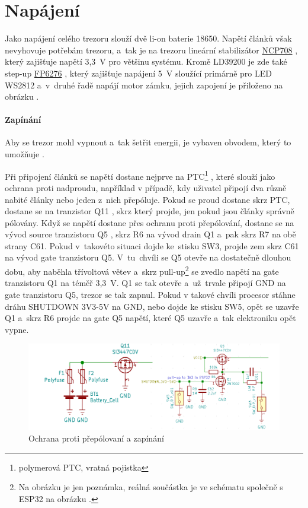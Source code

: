 \section{Napájení}
Jako napájení celého trezoru slouží dvě li-on baterie 18650. Napětí článků však nevyhovuje potřebám trezoru, a~tak je na trezoru lineární 
stabilizátor \href{https://datasheet.lcsc.com/szlcsc/1808280153_STMicroelectronics-LD39200PU33R_C222192.pdf}{NCP708} \parencite{LD39200}, 
který zajišťuje napětí 3,3~V pro většinu systému. Kromě LD39200 je zde také step-up \href{https://datasheet.lcsc.com/szlcsc/Feeling-Tech-FP6276AXR-G1_C83308.pdf}{FP6276} \parencite{fp6276a}, 
který zajišťuje napájení 5~V sloužící primárně pro LED WS2812 a~v~druhé řadě napájí motor zámku,
jejich zapojení je přiloženo na obrázku .

\paragraph*{Zapínání}
Aby se trezor mohl vypnout a~tak šetřit energii, je vybaven obvodem, který to umožňuje .

Při připojení článků se napětí dostane nejprve na PTC\footnote{polymerová PTC, vratná pojistka } \parencite{polyfuse},
které slouží jako ochrana proti nadproudu, například v případě, kdy uživatel připojí dva různě nabité články nebo jeden z~nich přepóluje.
Pokud se proud dostane skrz PTC, dostane se na tranzistor Q11 \parencite{power_MOSFET}, skrz který projde, jen pokud jsou články správně pólovány.
Když se napětí dostane přes ochranu proti přepólování, dostane se na 
vývod source
tranzistoru Q5 \parencite{power_MOSFET}, skrz R6 na vývod drain
Q1 a~pak skrz R7 na obě strany C61.
Pokud v~takovéto situaci dojde ke~stisku SW3, projde zem skrz C61 na vývod gate tranzistoru Q5. 
V~tu~chvíli se Q5 otevře na dostatečně dlouhou dobu, 
aby naběhla třívoltová větev a~skrz pull-up\footnote{Na obrázku je jen poznámka, reálná součástka je ve schématu společně s ESP32 na obrázku .}
se zvedlo napětí na gate tranzistoru Q1 na téměř 3,3~V. Q1 se tak otevře a~už~trvale připojí GND na gate tranzistoru Q5, trezor se tak zapnul. Pokud v takové chvíli procesor stáhne dráhu SHUTDOWN 3V3-5V 
na GND, nebo dojde ke stisku SW5, opět se uzavře Q1 a~skrz R6 projde na gate Q5 napětí, které Q5 uzavře a~tak elektroniku opět vypne.

\begin{figure}[h]
    \centering
    \includegraphics[width=\textwidth]{kapitoly/obrazky/E4/napajeni/ochrana_proti_prepolovani_a_zapinani.png}
    \caption{Ochrana proti přepólovaní a zapínání}
    \label{fig:E4-zapinani}
\end{figure}

